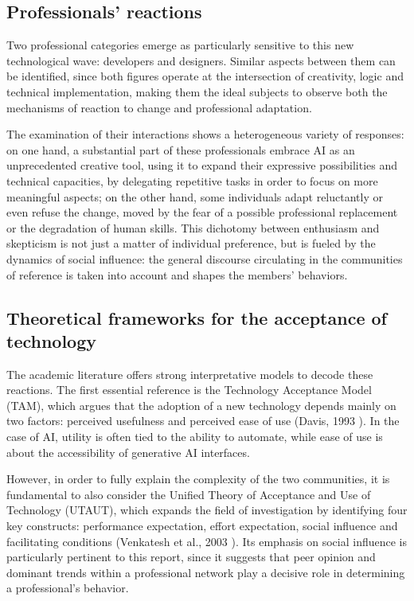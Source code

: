 \documentclass[conference]{IEEEtran}
\begin{document}
\subsection{Professionals’ reactions}
Two professional categories emerge as particularly sensitive to this new technological wave: developers and designers. Similar aspects between them can be identified, since both figures operate at the intersection of creativity, logic and technical implementation, making them the ideal subjects to observe both the mechanisms of reaction to change and professional adaptation.

The examination of their interactions shows a heterogeneous variety of responses: on one hand, a substantial part of these professionals embrace AI as an unprecedented creative tool, using it to expand their expressive possibilities and technical capacities, by delegating repetitive tasks in order to focus on more meaningful aspects; on the other hand, some individuals adapt reluctantly or even refuse the change, moved by the fear of a possible professional replacement or the degradation of human skills. This dichotomy between enthusiasm and skepticism is not just a matter of individual preference, but is fueled by the dynamics of social influence: the general discourse circulating in the communities of reference is taken into account and shapes the members’ behaviors.

\subsection{Theoretical frameworks for the acceptance of technology}
The academic literature offers strong interpretative models to decode these reactions. The first essential reference is the Technology Acceptance Model (TAM), which argues that the adoption of a new technology depends mainly on two factors: perceived usefulness and perceived ease of use (Davis, 1993 \cite{b1}). In the case of AI, utility is often tied to the ability to automate, while ease of use is about the accessibility of generative AI interfaces.

However, in order to fully explain the complexity of the two communities, it is fundamental to also consider the Unified Theory of Acceptance and Use of Technology (UTAUT), which expands the field of investigation by identifying four key constructs: performance expectation, effort expectation, social influence and facilitating conditions (Venkatesh et al., 2003 \cite{b2}). Its emphasis on social influence is particularly pertinent to this report, since it suggests that peer opinion and dominant trends within a professional network play a decisive role in determining a professional's behavior.
\end{document}
